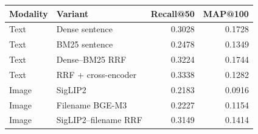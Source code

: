 \begin{tabular}{llrr}
\toprule
Modality & Variant & Recall@50 & MAP@100 \\
\midrule
Text & Dense sentence & 0.3028 & 0.1728 \\
Text & BM25 sentence & 0.2478 & 0.1349 \\
Text & Dense--BM25 RRF & 0.3224 & 0.1744 \\
Text & RRF + cross-encoder & 0.3338 & 0.1282 \\
Image & SigLIP2 & 0.2183 & 0.0916 \\
Image & Filename BGE-M3 & 0.2227 & 0.1154 \\
Image & SigLIP2--filename RRF & 0.3149 & 0.1414 \\
\bottomrule
\end{tabular}
